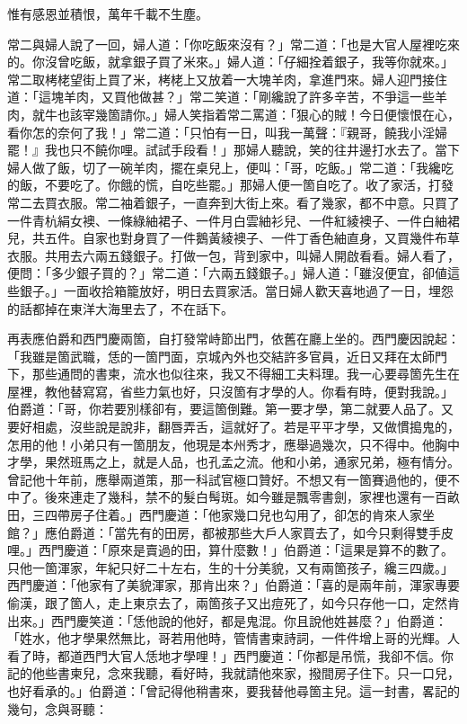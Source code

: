 \begin{myquote}
惟有感恩並積恨，萬年千載不生塵。
\end{myquote}

常二與婦人說了一回，婦人道：「你吃飯來沒有？」常二道：「也是大官人屋裡吃來的。你沒曾吃飯，就拿銀子買了米來。」婦人道：「仔細拴着銀子，我等你就來。」{}常二取栲栳望街上買了米，栲栳上又放着一大塊羊肉，拿進門來。婦人迎門接住道：「這塊羊肉，又買他做甚？」常二笑道：「剛纔說了許多辛苦，不爭這一些羊肉，就牛也該宰幾箇請你。」婦人笑指着常二罵道：「狠心的賊！今日便懷恨在心，看你怎的奈何了我！」常二道：「只怕有一日，叫我一萬聲：『親哥，饒我小淫婦罷！』我也只不饒你哩。試試手段看！」{}那婦人聽說，笑的往井邊打水去了。當下婦人做了飯，切了一碗羊肉，擺在桌兒上，便叫：「哥，吃飯。」常二道：「我纔吃的飯，不要吃了。你餓的慌，自吃些罷。」那婦人便一箇自吃了。收了家活，打發常二去買衣服。常二袖着銀子，一直奔到大街上來。看了幾家，都不中意。只買了一件青杭絹女襖、一條綠紬裙子、一件月白雲紬衫兒、一件紅綾襖子、一件白紬裙兒，共五件。自家也對身買了一件鵝黃綾襖子、一件丁香色紬直身，又買幾件布草衣服。共用去六兩五錢銀子。打做一包，背到家中，叫婦人開啟看看。婦人看了，便問：「多少銀子買的？」常二道：「六兩五錢銀子。」婦人道：「雖沒便宜，卻値這些銀子。」一面收拾箱籠放好，明日去買家活。當日婦人歡天喜地過了一日，埋怨的話都掉在東洋大海里去了，不在話下。

再表應伯爵和西門慶兩箇，自打發常峙節出門，依舊在廳上坐的。西門慶因說起：「我雖是箇武職，恁的一箇門面，京城內外也交結許多官員，近日又拜在太師門下，那些通問的書柬，流水也似往來，我又不得細工夫料理。我一心要尋箇先生在屋裡，教他替寫寫，省些力氣也好，只沒箇有才學的人。你看有時，便對我說。」伯爵道：「哥，你若要別樣卻有，要這箇倒難。第一要才學，第二就要人品了。又要好相處，沒些說是說非，翻唇弄舌，這就好了。若是平平才學，又做慣搗鬼的，怎用的他！小弟只有一箇朋友，他現是本州秀才，應舉過幾次，只不得中。他胸中才學，果然班馬之上，就是人品，也孔孟之流。他和小弟，通家兄弟，極有情分。曾記他十年前，應舉兩道策，那一科試官極口贊好。不想又有一箇賽過他的，便不中了。後來連走了幾科，禁不的髮白髩斑。如今雖是飄零書劍，家裡也還有一百畝田，三四帶房子住着。」西門慶道：「他家幾口兒也勾用了，卻怎的肯來人家坐館？」應伯爵道：「當先有的田房，都被那些大戶人家買去了，如今只剩得雙手皮哩。」{}西門慶道：「原來是賣過的田，算什麼數！」伯爵道：「這果是算不的數了。只他一箇渾家，年紀只好二十左右，生的十分美貌，又有兩箇孩子，纔三四歲。」西門慶道：「他家有了美貌渾家，那肯出來？」伯爵道：「喜的是兩年前，渾家專要偷漢，跟了箇人，走上東京去了，兩箇孩子又出痘死了，如今只存他一口，定然肯出來。」西門慶笑道：「恁他說的他好，都是鬼混。你且說他姓甚麼？」伯爵道：「姓水，他才學果然無比，哥若用他時，管情書柬詩詞，一件件增上哥的光輝。人看了時，都道西門大官人恁地才學哩！」西門慶道：「你都是吊慌，我卻不信。你記的他些書柬兒，念來我聽，看好時，我就請他來家，撥間房子住下。只一口兒，也好看承的。」伯爵道：「曾記得他稍書來，要我替他尋箇主兒。這一封書，畧記的幾句，念與哥聽：

